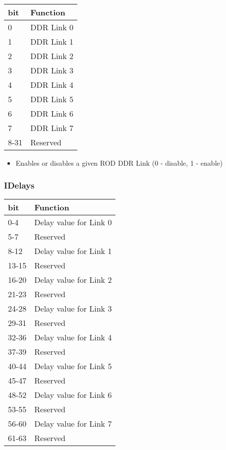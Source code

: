 \begin {table}[H]
\begin{center}
\begin{tabular}{|l|l|}
\hline
\textbf{bit} & \textbf{Function} \\
\hline
0 & DDR Link 0 \\
\hline
1 & DDR Link 1 \\
\hline
2 & DDR Link 2 \\
\hline
3 & DDR Link 3 \\
\hline
4 & DDR Link 4 \\
\hline
5 & DDR Link 5 \\
\hline
6 & DDR Link 6 \\
\hline
7 & DDR Link 7 \\
\hline
8-31 & Reserved \\
\hline
\end{tabular}
\end{center}
\end{table}


\begin{itemize}
\item Enables or disables a given ROD DDR Link (0 - disable, 1 - enable)
\end{itemize}




\subsubsection{IDelays}

\begin {table}[H]
\begin{center}
\begin{tabular}{|l|l|}
\hline
\textbf{bit} & \textbf{Function} \\
\hline
0-4 & Delay value for Link 0 \\
\hline
5-7 & Reserved \\
\hline
8-12 & Delay value for Link 1 \\
\hline
13-15 & Reserved \\
\hline
16-20 & Delay value for Link 2 \\
\hline
21-23 & Reserved \\
\hline
24-28 & Delay value for Link 3 \\
\hline
29-31 & Reserved \\
\hline
32-36 & Delay value for Link 4 \\
\hline
37-39 & Reserved \\
\hline
40-44 & Delay value for Link 5 \\
\hline
45-47 & Reserved \\
\hline
48-52 & Delay value for Link 6 \\
\hline
53-55 & Reserved \\
\hline
56-60 & Delay value for Link 7 \\
\hline
61-63 & Reserved \\
\hline
\end{tabular}
\end{center}
\end{table}


